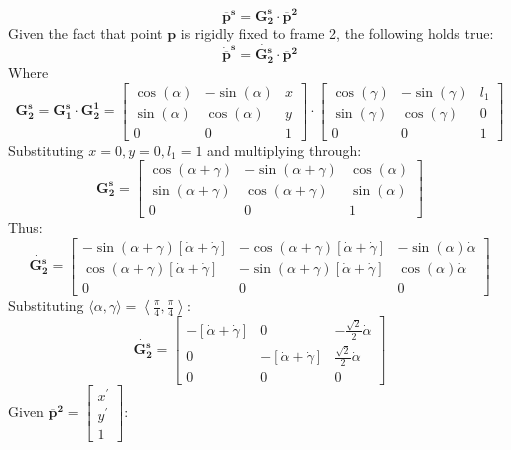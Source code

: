 \documentclass{article}
\begin{document}
\[
\bm{\mathbf{\overline{p}^s}} = \bm{\mathbf{G^{s}_{2}}} \cdot \bm{\mathbf{\overline{p}^2}}
\]
Given the fact that point \(\bm{\mathbf{p}}\) is rigidly fixed to frame 2, the following holds true:
\[
\bm{\mathbf{\dot{\overline{p}}^s}} = \bm{\mathbf{\dot{G^{s}_{2}}}} \cdot \bm{\mathbf{\overline{p}^2}}
\]
Where
\[
\bm{\mathbf{G^{s}_{2}}} = \bm{\mathbf{G^{s}_{1}}} \cdot \bm{\mathbf{G^{1}_{2}}} = \begin{bmatrix}
\cos(\alpha) & -\sin(\alpha) & x \\
\sin(\alpha) & \cos(\alpha)  & y \\
0 & 0 & 1
\end{bmatrix} \cdot
\begin{bmatrix}
\cos(\gamma) & -\sin(\gamma) & l_1 \\

\sin(\gamma) & \cos(\gamma)  & 0 \\
0 & 0 & 1
\end{bmatrix}
\]
Substituting \(x = 0, y = 0, l_1 = 1\) and multiplying through:
\[
\bm{\mathbf{G^{s}_{2}}} =
\begin{bmatrix}
\cos(\alpha + \gamma) & -\sin(\alpha + \gamma) & \cos(\alpha) \\
\sin(\alpha + \gamma) & \cos(\alpha + \gamma) & \sin(\alpha) \\
0 & 0 & 1
\end{bmatrix}
\]
Thus:
\[
\bm{\mathbf{\dot{G^{s}_{2}}}} = \begin{bmatrix}
    -\sin(\alpha + \gamma) \left[ \dot{\alpha} + \dot{\gamma} \right] & -\cos(\alpha + \gamma) \left[ \dot{\alpha} + \dot{\gamma} \right] & -\sin(\alpha)\dot{\alpha} \\
    \cos(\alpha + \gamma) \left[ \dot{\alpha} + \dot{\gamma} \right] & -\sin(\alpha + \gamma) \left[ \dot{\alpha} + \dot{\gamma} \right] & \cos(\alpha)\dot{\alpha} \\
    0 & 0 & 0
\end{bmatrix}
\]
Substituting \(\langle \alpha, \gamma \rangle = \left\langle \frac{\pi}{4}, \frac{\pi}{4} \right\rangle\):
\[
\bm{\mathbf{\dot{G^{s}_{2}}}} = \begin{bmatrix}
    -\left[ \dot{\alpha} + \dot{\gamma} \right] & 0 & -\frac{\sqrt{2}}{2}\dot{\alpha} \\
    0 & -\left[ \dot{\alpha} + \dot{\gamma} \right] & \frac{\sqrt{2}}{2}\dot{\alpha} \\
    0 & 0 & 0
\end{bmatrix}
\]
Given \(\bm{\mathbf{\overline{p}^2}} = \begin{bmatrix}
    x^{'} \\ y^{'} \\ 1
\end{bmatrix}\):
\end{document}

